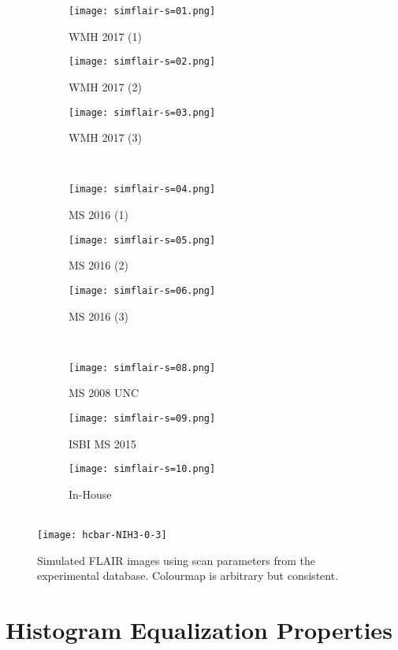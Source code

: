\begin{figure}[h]
  \centering
  \begin{subfigure}{0.25\textwidth}\centering\texttt{[image: simflair-s=01.png]}\caption{WMH 2017 (1)}\end{subfigure}
  \begin{subfigure}{0.25\textwidth}\centering\texttt{[image: simflair-s=02.png]}\caption{WMH 2017 (2)}\end{subfigure}
  \begin{subfigure}{0.25\textwidth}\centering\texttt{[image: simflair-s=03.png]}\caption{WMH 2017 (3)}\end{subfigure}\\[0.5em]
  \begin{subfigure}{0.25\textwidth}\centering\texttt{[image: simflair-s=04.png]}\caption{MS  2016 (1)}\end{subfigure}
  \begin{subfigure}{0.25\textwidth}\centering\texttt{[image: simflair-s=05.png]}\caption{MS  2016 (2)}\end{subfigure}
  \begin{subfigure}{0.25\textwidth}\centering\texttt{[image: simflair-s=06.png]}\caption{MS  2016 (3)}\end{subfigure}\\[0.5em]
  \begin{subfigure}{0.25\textwidth}\centering\texttt{[image: simflair-s=08.png]}\caption{MS  2008 UNC}\end{subfigure}
  \begin{subfigure}{0.25\textwidth}\centering\texttt{[image: simflair-s=09.png]}\caption{ISBI MS 2015}\end{subfigure}
  \begin{subfigure}{0.25\textwidth}\centering\texttt{[image: simflair-s=10.png]}\caption{In-House    }\end{subfigure}\\[0.5em]
  \texttt{[image: hcbar-NIH3-0-3]}
  \caption{Simulated FLAIR images using scan parameters from the experimental database. Colourmap is arbitrary but consistent.}
  \label{fig:simflair}
\end{figure}

\section{Histogram Equalization Properties}




